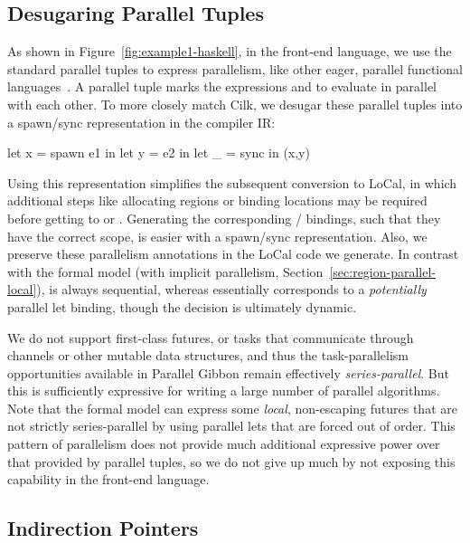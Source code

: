 \documentclass[acmsmall,acmthm=false,nonacm]{acmart}
\theoremstyle{straighttext0}
\theoremstyle{straighttext}
\newcommand{\Secref}[1]{Section~\ref{#1}}
\newcommand{\Figref}[1]{Figure~\ref{#1}}
\begin{document}
{%
\subsection{Desugaring Parallel Tuples}


As shown in \Figref{fig:example1-haskell},
in the front-end language, we use the standard parallel tuples to express parallelism,
like other eager, parallel functional languages~\cite{manticore,MPL}.
%
A parallel tuple 
marks the expressions  and  to evaluate in parallel with each other.
%
To more closely match Cilk, we desugar these parallel tuples into a spawn/sync representation in the compiler IR:
%
\begin{code}
let x = spawn e1 in
let y = e2 in
let _ = sync in
(x,y)
\end{code}
%
Using this representation simplifies the subsequent conversion to LoCal,
in which additional steps like allocating regions or binding locations
may be required before getting to  or .
%
Generating the corresponding / bindings, such that they have
the correct scope, is easier with a spawn/sync representation.
%
Also, we preserve these parallelism annotations in the LoCal code we
generate.  In contrast with the formal model (with implicit
parallelism, \Secref{sec:region-parallel-local}), 
is always sequential, whereas  essentially
corresponds to a {\em potentially} parallel let binding, though the decision
is ultimately dynamic.

We do not support first-class futures, or tasks that communicate through channels
or other mutable data structures, and thus the task-parallelism opportunities available in
Parallel Gibbon remain effectively {\em series-parallel}.
%
But this is sufficiently expressive for writing a large number of parallel algorithms.
%
Note that the formal model can express some {\em local}, non-escaping futures that are not strictly series-parallel by using parallel lets that are
forced out of order. This pattern of parallelism does not provide much additional expressive power over that provided by parallel tuples, so we do not give up much by not exposing this capability in the front-end language.



\subsection{Indirection Pointers}
\label{subsec:indirection-pointers}

}
\end{document}
